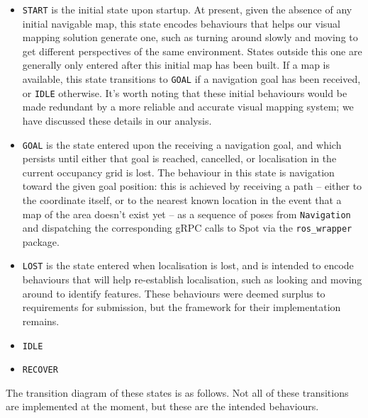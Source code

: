 \documentclass[10pt,english]{article}
\begin{document}
\begin{itemize}[noitemsep]
    \item \texttt{START} is the initial state upon startup. At present, given the absence of any initial navigable map, this state encodes behaviours that helps our visual mapping solution generate one, such as turning around slowly and moving to get different perspectives of the same environment. States outside this one are generally only entered after this initial map has been built. If a map is available, this state transitions to \texttt{GOAL} if a navigation goal has been received, or \texttt{IDLE} otherwise. It's worth noting that these initial behaviours would be made redundant by a more reliable and accurate visual mapping system; we have discussed these details in our analysis.
    \item \texttt{GOAL} is the state entered upon the receiving a navigation goal, and which persists until either that goal is reached, cancelled, or localisation in the current occupancy grid is lost. The behaviour in this state is navigation toward the given goal position: this is achieved by receiving a path -- either to the coordinate itself, or to the nearest known location in the event that a map of the area doesn't exist yet -- as a sequence of poses from \texttt{Navigation} and dispatching the corresponding gRPC calls to Spot via the \texttt{ros\_wrapper} package.
    \item \texttt{LOST} is the state entered when localisation is lost, and is intended to encode behaviours that will help re-establish localisation, such as looking and moving around to identify features. These behaviours were deemed surplus to requirements for submission, but the framework for their implementation remains.
    \item \texttt{IDLE}  %
    \item \texttt{RECOVER}
\end{itemize}

The transition diagram of these states is as follows. Not all of these transitions are implemented at the moment, but these are the intended behaviours.

\begin{center} %
\end{center}
\end{document}
